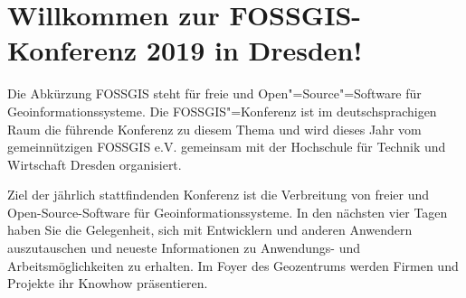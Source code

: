 \newpage
\section*{Willkommen zur FOSSGIS-Konferenz 2019 in Dresden!} \label{welcome}
Die Abkürzung FOSSGIS steht für freie und Open"=Source"=Software für Geoinformationssysteme.
Die FOSSGIS"=Konferenz ist im deutschsprachigen Raum die führende Konferenz zu diesem Thema
und wird dieses Jahr vom gemeinnützigen FOSSGIS e.V.
gemeinsam mit der Hochschule für Technik und Wirtschaft Dresden organisiert.

Ziel der jährlich stattfindenden Konferenz ist die Verbreitung von freier und
Open-Source-Software für Geoinformationssysteme. In den nächsten vier Tagen
haben Sie die Gelegenheit, sich mit Entwicklern und anderen Anwendern auszutauschen und
neueste Informationen zu Anwendungs- und Arbeitsmöglichkeiten zu erhalten. Im
Foyer des Geozentrums werden Firmen und Projekte ihr Knowhow präsentieren.

\newpage



